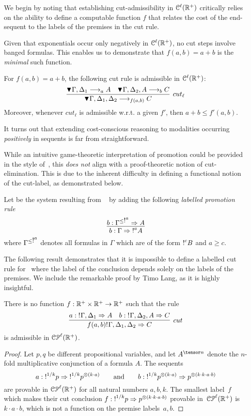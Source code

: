 
We begin by noting that establishing cut-admissibility in $\mathcal{C}^\ell(\mathbb{R}^+)$ critically relies on the ability to define a computable function $f$ that relates the cost of the end-sequent to the labels of the premises in the cut rule.

Given that exponentials occur only negatively in $\mathcal{C}^\ell(\mathbb{R}^+)$, no cut steps involve banged formulas. This enables us to demonstrate that $f(a,b) = a + b$ is the {\em minimal} such function.
\begin{theorem}\label{thm:cutAdm}
For $f(a,b)=a+b$, the following cut rule is admissible in $\mathcal{C}^\ell(\mathbb{R}^+)$:
\[
\infer[cut_\ell]{\pnbang{}\Gamma,\Delta_1,\Delta_2\lra_{f(a,b)} C}
	{ \pnbang{}\Gamma,\Delta_1\lra_a A &
	\pnbang{}\Gamma,\Delta_2,A\lra_b C
	}
\]
Moreover, whenever $cut_\ell$ is admissible w.r.t. a given $f'$, then $a+b\leq f'(a,b)$.
\end{theorem}

It turns out that extending cost-conscious reasoning to modalities occurring {\em positively} in sequents is far from straightforward.

While an intuitive game-theoretic interpretation of promotion could be provided in the style of~\cite{DBLP:conf/tableaux/FermullerL17}, this {\em does not} align with a proof-theoretic notion of cut-elimination. This is due to the inherent difficulty in defining a functional notion of the cut-label, as demonstrated below.

Let  
\laSELLR  be the system resulting from \laIMALLR~ by 
adding the following \emph{labelled promotion rule}
\[
\infer{b:\Gamma\seq \nbang{a} A}{b:\Gamma^{\leqn{a}}\seq A}
\]
where $\Gamma^{\leq \hbox{$\mathop{!}^{a}$}{}}$ denotes all formulas in $\Gamma$ which are of the form $\hbox{$\mathop{!}^{c}$} B$  and $a \geq c$. 


The following result demonstrates that it is impossible to define a labelled cut rule for \laSELLR\ where the label of the conclusion depends solely on the labels of the premises. We include the remarkable proof by Timo Lang, as it is highly insightful.
\begin{theorem}\label{thm:impossible} There is no function $f:\mathbb{R}^+\times \mathbb{R}^+\rightarrow\mathbb{R}^+$ such that the rule
\[
\infer[cut]{f(a,b)\nbang{}\Gamma,\Delta_1,\Delta_2\seq C}
	{a: \nbang{}\Gamma,\Delta_1\seq A &
	b:\nbang{}\Gamma,\Delta_2,A\seq C
	}
\]
is admissible in $\mathcal{CP}^\ell(\mathbb{R}^{+})$.
\end{theorem}
\begin{proof}
Let $p,q$ be different propositional variables, and let $A^{\tensor n}$ denote the $n$-fold multiplicative conjunction of a formula $A$. The sequents
\[a:\hbox{$\mathop{!}^{1/k}$}p\Rightarrow\hbox{$\mathop{!}^{1/k}$}p^{\otimes (k\cdot a)}\qquad\text{and}\qquad b:\hbox{$\mathop{!}^{1/k}$}p^{\otimes (k\cdot a)}\Rightarrow p^{\otimes(k\cdot k\cdot a\cdot b)} 
\]
are provable in $\mathcal{CP}^\ell(\mathbb{R}^{+})$ for all natural numbers $a,b,k$. The smallest label~$f$ which makes their cut conclusion
$f: \hbox{$\mathop{!}^{1/k}$}p\Rightarrow p^{\otimes(k\cdot k\cdot a\cdot b)}
$ 
provable in~$\mathcal{CP}^\ell(\mathbb{R}^{+})$ is~$k\cdot a\cdot b$, which is not a function on the premise labels~$a,b$.
\end{proof}

